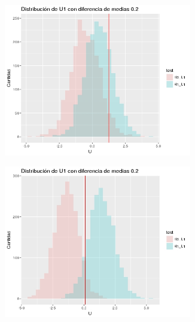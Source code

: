 \documentclass[%
 reprint,
 amsmath,amssymb,
 aps,
spanish]{revtex4-1}
\begin{document}
\begin{figure}[t]
    \centering
    \begin{subfigure}[t]{0.3\textwidth}
      \centering
      \includegraphics[width=0.9\textwidth]{imagenes/histograma_U1_02_10}
    \end{subfigure}
    \begin{subfigure}[t]{0.3\textwidth}
      \centering
      \includegraphics[width=0.9\textwidth]{imagenes/histograma_U1_02_100}
    \end{subfigure}
    \begin{subfigure}[t]{0.3\textwidth}
      \centering

\end{subfigure}
\end{figure}
\end{document}

